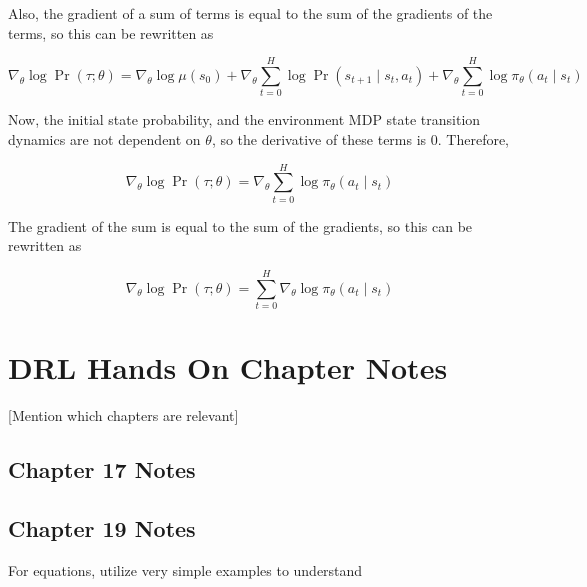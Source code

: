 \documentclass[acmlarge,screen]{acmart}
\begin{document}
\noindent Also, the gradient of a sum of terms is equal to the sum of the gradients of the terms, so this can be rewritten as

\begin{equation}
  \nabla_\theta \log \Pr (\tau; \theta) = \nabla_\theta \log \mu(s_0) + \nabla_\theta \sum_{t=0}^H \log \Pr(s_{t+1} \mid s_t, a_t) + \nabla_\theta \sum_{t=0}^H \log \pi_\theta (a_t \mid s_t)
\label{eq:policygradienttheoryderivation9}
\end{equation}

\noindent Now, the initial state probability, and the environment MDP state transition dynamics are not dependent on $\theta$, so the derivative of these terms is 0.
Therefore,

\begin{equation}
  \nabla_\theta \log \Pr (\tau; \theta) =  \nabla_\theta \sum_{t=0}^H \log \pi_\theta (a_t \mid s_t)
\label{eq:policygradienttheoryderivation10}
\end{equation}

\noindent The gradient of the sum is equal to the sum of the gradients, so this can be rewritten as

\begin{equation}
  \nabla_\theta \log \Pr (\tau; \theta) =  \sum_{t=0}^H \nabla_\theta \log \pi_\theta (a_t \mid s_t)
\label{eq:policygradienttheoryderivation10}
\end{equation}













\section{DRL Hands On Chapter Notes}

[Mention which chapters are relevant]

\subsection{Chapter 17 Notes}


\subsection{Chapter 19 Notes}

For equations, utilize very simple examples to understand
\end{document}

